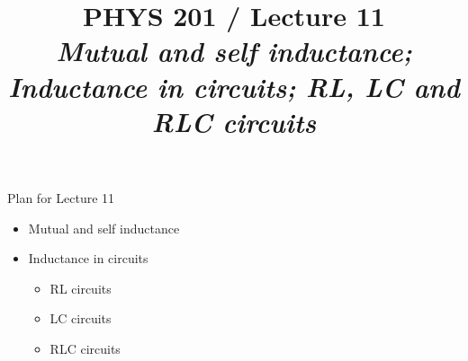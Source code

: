 \renewcommand{\prevlecture}{10 }
\renewcommand{\thislecture}{11 }
\renewcommand{\nextlecture}{12 }

%
%

\title[PHYS 201 / Lecture \thislecture]
{
  PHYS 201 / Lecture \thislecture\\
  {\it Mutual and self inductance; \\ Inductance in circuits; RL, LC and RLC circuits}\\
}



\begin{frame}[plain]
  \titlepage
\end{frame}


%
%

\renewcommand{\lecturesummarytitle}{Revision }


%
%

\begin{frame}{Plan for Lecture \thislecture}

\begin{itemize}
\item Mutual and self inductance
\item Inductance in circuits
  \begin{itemize}
      \item RL circuits
      \item LC circuits
      \item RLC circuits
  \end{itemize}
\end{itemize}

\end{frame}


%
%
%

